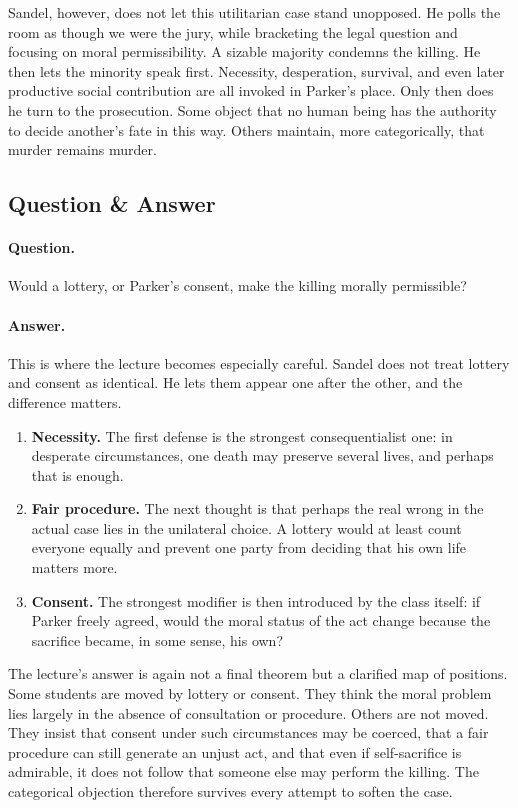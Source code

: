 Sandel, however, does not let this utilitarian case stand unopposed. He polls the room as though we were the jury, while bracketing the legal question and focusing on moral permissibility. A sizable majority condemns the killing. He then lets the minority speak first. Necessity, desperation, survival, and even later productive social contribution are all invoked in Parker's place. Only then does he turn to the prosecution. Some object that no human being has the authority to decide another's fate in this way. Others maintain, more categorically, that murder remains murder.

\subsection{Question \& Answer}

\paragraph{Question.} Would a lottery, or Parker's consent, make the killing morally permissible?

\paragraph{Answer.} This is where the lecture becomes especially careful. Sandel does not treat lottery and consent as identical. He lets them appear one after the other, and the difference matters.

\begin{enumerate}
\item \textbf{Necessity.} The first defense is the strongest consequentialist one: in desperate circumstances, one death may preserve several lives, and perhaps that is enough.
\item \textbf{Fair procedure.} The next thought is that perhaps the real wrong in the actual case lies in the unilateral choice. A lottery would at least count everyone equally and prevent one party from deciding that his own life matters more.
\item \textbf{Consent.} The strongest modifier is then introduced by the class itself: if Parker freely agreed, would the moral status of the act change because the sacrifice became, in some sense, his own?
\end{enumerate}

The lecture's answer is again not a final theorem but a clarified map of positions. Some students are moved by lottery or consent. They think the moral problem lies largely in the absence of consultation or procedure. Others are not moved. They insist that consent under such circumstances may be coerced, that a fair procedure can still generate an unjust act, and that even if self-sacrifice is admirable, it does not follow that someone else may perform the killing. The categorical objection therefore survives every attempt to soften the case.

